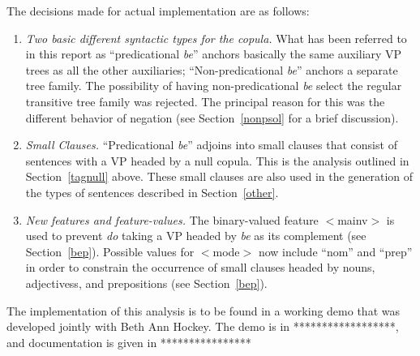 The decisions made for actual implementation are as follows:
\begin{enumerate}

\item {\em Two basic different syntactic types for the copula.} 
What has been referred to in this report as ``predicational {\em be\/}'' anchors
basically the same auxiliary VP trees as all the other auxiliaries;
``Non-predicational {\em be\/}'' anchors a separate tree family.  The possibility
of having non-predicational {\em be} select the regular transitive tree family was
rejected. The principal reason for this was the different behavior of negation
(see Section~\ref{nonpsol} for a brief discussion). 

\item {\em Small Clauses.\/}
``Predicational {\em be}'' adjoins into small clauses that consist of sentences
with a VP headed by a null copula.  This is the analysis outlined in
Section~\ref{tagnull} above. These small clauses are also used in the generation
of the types of sentences described in Section~\ref{other}.

\item {\em New features and feature-values.}
The binary-valued feature $<$mainv$>$ is used to prevent {\em do} taking a VP
headed by {\em be} as its complement (see Section~\ref{bep}). 
Possible values for $<$mode$>$  now  include ``nom'' and ``prep'' in order to
constrain the occurrence of small clauses headed by nouns, adjectivess, and
prepositions (see Section~\ref{bep}).

\end{enumerate}

The implementation of this analysis is to be found in a working demo that was
developed jointly with Beth Ann Hockey. The demo is in ******************, and
documentation is given in ****************

